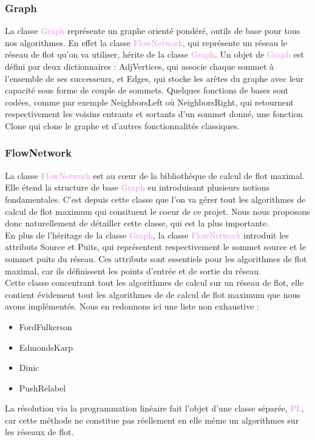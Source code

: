 \documentclass[a4paper]{article}
\begin{document}
\subsubsection{Graph}

La classe \textcolor{violet}{Graph} représente un graphe orienté pondéré, outils de base pour tous nos algorithmes. En effet la classe \textcolor{violet}{FlowNetwork}, qui représente un réseau le réseau de flot qu'on va utiliser, hérite de la classe \textcolor{violet}{Graph}. Un objet de \textcolor{violet}{Graph} est défini par deux dictionnaires : \textcolor{blue!60}{AdjVertices}, qui associe chaque sommet à l'ensemble de ses successeurs, et \textcolor{blue!60}{Edges}, qui stocke les arêtes du graphe avec leur capacité sous forme de couple de sommets.
Quelques fonctions de bases sont codées, comme par exemple \textcolor{green!60!black}{NeighborsLeft} où \textcolor{green!60!black}{NeighborsRight}, qui retournent respectivement les voisins entrants et sortants d'un sommet donné, une fonction \textcolor{green!60!black}{Clone} qui clone le graphe et d'autres fonctionnalités classiques.

\subsubsection{FlowNetwork}

La classe \textcolor{violet}{FlowNetwork} est au cœur de la bibliothèque de calcul de flot maximal. Elle étend la structure de base \textcolor{violet}{Graph} en introduisant plusieurs notions fondamentales. C'est depuis cette classe que l'on va gérer tout les algorithmes de calcul de flot maximum qui consituent le coeur de ce projet. Nous nous proposons donc naturellement de détailler cette classe, qui est la plus importante.\\

En plus de l'héritage de la classe \textcolor{violet}{Graph}, la classe \textcolor{violet}{FlowNetwork} introduit les attributs \textcolor{blue!60}{Source} et \textcolor{blue!60}{Puits}, qui représentent respectivement le sommet source et le sommet puits du réseau. Ces attributs sont essentiels pour les algorithmes de flot maximal, car ils définissent les points d'entrée et de sortie du réseau.\\

Cette classe concentrant tout les algorithmes de calcul sur un réseau de flot, elle contient évidement tout les algorithmes de de calcul de flot maximum que nous avons implémentés. Nous en redonnons ici une liste non exhaustive :
\begin{itemize}
	\item \textcolor{green!60!black}{FordFulkerson}
	\item \textcolor{green!60!black}{EdmondsKarp}
	\item \textcolor{green!60!black}{Dinic}
	\item \textcolor{green!60!black}{PushRelabel}
\end{itemize}
La résolution via la programmation linéaire fait l'objet d'une classe séparée, \textcolor{violet}{PL}, car cette méthode ne constitue pas réellement en elle même un algorithmes sur les réseaux de flot.\\
\end{document}
